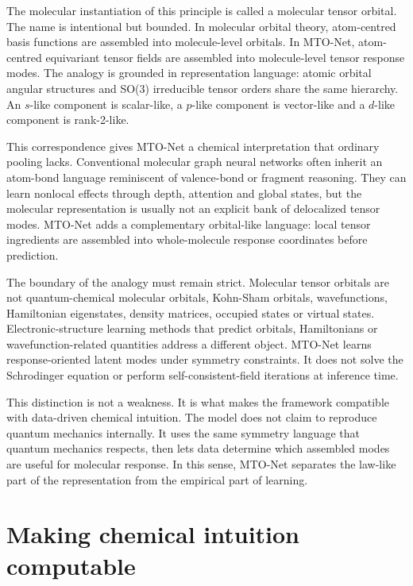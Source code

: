 \documentclass[11pt]{article}
\begin{document}
The molecular instantiation of this principle is called a molecular tensor orbital. The name is intentional but bounded. In molecular orbital theory, atom-centred basis functions are assembled into molecule-level orbitals. In MTO-Net, atom-centred equivariant tensor fields are assembled into molecule-level tensor response modes. The analogy is grounded in representation language: atomic orbital angular structures and SO(3) irreducible tensor orders share the same hierarchy. An $s$-like component is scalar-like, a $p$-like component is vector-like and a $d$-like component is rank-2-like.

This correspondence gives MTO-Net a chemical interpretation that ordinary pooling lacks. Conventional molecular graph neural networks often inherit an atom-bond language reminiscent of valence-bond or fragment reasoning. They can learn nonlocal effects through depth, attention and global states, but the molecular representation is usually not an explicit bank of delocalized tensor modes. MTO-Net adds a complementary orbital-like language: local tensor ingredients are assembled into whole-molecule response coordinates before prediction.

The boundary of the analogy must remain strict. Molecular tensor orbitals are not quantum-chemical molecular orbitals, Kohn-Sham orbitals, wavefunctions, Hamiltonian eigenstates, density matrices, occupied states or virtual states. Electronic-structure learning methods that predict orbitals, Hamiltonians or wavefunction-related quantities address a different object\citep{Schutt2019SchNOrb,Qiao2020OrbNet,Qiao2022OrbNetEqui,Li2022DeepH,Gong2023DeepHE3,Yu2023QHNet,Yu2023QH9}. MTO-Net learns response-oriented latent modes under symmetry constraints. It does not solve the Schrodinger equation or perform self-consistent-field iterations at inference time.

This distinction is not a weakness. It is what makes the framework compatible with data-driven chemical intuition. The model does not claim to reproduce quantum mechanics internally. It uses the same symmetry language that quantum mechanics respects, then lets data determine which assembled modes are useful for molecular response. In this sense, MTO-Net separates the law-like part of the representation from the empirical part of learning.

\section*{Making chemical intuition computable}
\end{document}
